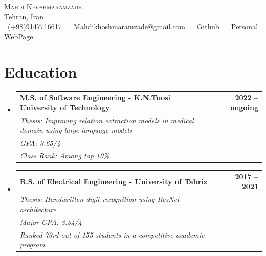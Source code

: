\documentclass[letterpaper,11pt]{article}
\makeatletter
\newcommand{\resumeSubheadingeducation}[7]{
	\vspace{-2pt}\item
	\begin{tabular*}{1.0\textwidth}[t]{l@{\extracolsep{\fill}}r}
		\textbf{#1} & \textbf{\small #2} \\
		\textit{\small#3} & \textit{\small #4} \\
		\textit{\small#5} & \textit{\small #6} \\
		\textit{\small#7}
	\end{tabular*}\vspace{-7pt}
}
\newcommand{\resumeSubHeadingListStart}{\begin{itemize}[leftmargin=0.0in, label={}]}
\newcommand{\resumeSubHeadingListEnd}{\end{itemize}}
\makeatother
\begin{document}
	
	
	\begin{center}
		{\Huge \scshape \textcolor{title-color}{Mahdi Khoshmaramzade}} \\ \vspace{1pt}
		Tehran, Iran \\ \vspace{1pt}
		\small \raisebox{-0.1\height}\faPhone\ (+98)9147716617 ~ \href{mailto:Mahdikhoshmaramzade@gmail.com}{\raisebox{-0.2\height}\faEnvelope\  \underline{Mahdikhoshmaramzade@gmail.com}} ~
		\href{https://github.com/mahdi-khoshmaram}{\raisebox{-0.2\height}\faGithub\  \underline{Github}} ~
		\href{https://mahdi-khoshmaram.github.io/}{\raisebox{-0.2\height}\faGlobe\  \underline{Personal WebPage}}
		\vspace{-1pt}
	\end{center}
	
	
	\section{\textcolor{title-color}{Education}}
	\resumeSubHeadingListStart
	\resumeSubheadingeducation
	{M.S. of Software Engineering - K.N.Toosi University of Technology}{2022 -- ongoing}
	{Thesis:  Improving relation extraction models in medical domain using large language models}{}{GPA: 3.65/4}{}{Class Rank: Among top 10\%}
	
	\resumeSubheadingeducation
	{B.S. of Electrical Engineering - University of Tabriz}{2017 -- 2021}
	{Thesis: Handwritten digit recognition using ResNet architecture}{}{Major GPA: 3.34/4}{}{Ranked 73rd out of 155 students in a competitive academic program}
	
	\resumeSubHeadingListEnd
	
\end{document}
